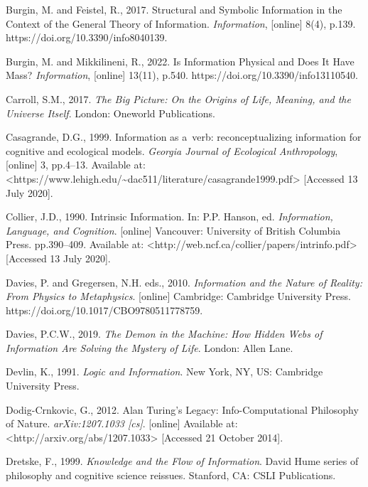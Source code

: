 Burgin, M. and Feistel, R., 2017. Structural and Symbolic Information in the Context of the General Theory of Information. \textit{Information}, [online] 8(4), p.139. https://doi.org/10.3390/info8040139.



Burgin, M. and Mikkilineni, R., 2022. Is Information Physical and Does It Have Mass? \textit{Information}, [online] 13(11), p.540. https://doi.org/10.3390/info13110540.



Carroll, S.M., 2017. \textit{The Big Picture: On the Origins of Life, Meaning, and the Universe Itself}. London: Oneworld Publications.



Casagrande, D.G., 1999. Information as a~verb: reconceptualizing information for cognitive and ecological models. \textit{Georgia Journal of Ecological Anthropology}, [online] 3, pp.4–13. Available at: {\textless}https://www.lehigh.edu/\~{}dac511/literature/casagrande1999.pdf{\textgreater} [Accessed 13 July 2020].



Collier, J.D., 1990. Intrinsic Information. In: P.P. Hanson, ed. \textit{Information, Language, and Cognition}. [online] Vancouver: University of British Columbia Press. pp.390–409. Available at: {\textless}http://web.ncf.ca/collier/papers/intrinfo.pdf{\textgreater} [Accessed 13 July 2020].



Davies, P. and Gregersen, N.H. eds., 2010. \textit{Information and the Nature of Reality: From Physics to Metaphysics}. [online] Cambridge: Cambridge University Press. https://doi.org/10.1017/CBO9780511778759.



Davies, P.C.W., 2019. \textit{The Demon in the Machine: How Hidden Webs of Information Are Solving the Mystery of Life}. London: Allen Lane.



Devlin, K., 1991. \textit{Logic and Information}. New York, NY, US: Cambridge University Press.



Dodig-Crnkovic, G., 2012. Alan Turing's Legacy: Info-Computational Philosophy of Nature. \textit{arXiv:1207.1033 [cs]}. [online] Available at: {\textless}http://arxiv.org/abs/1207.1033{\textgreater} [Accessed 21 October 2014].



Dretske, F., 1999. \textit{Knowledge and the Flow of Information}. David Hume series of philosophy and cognitive science reissues. Stanford, CA: CSLI Publications.



